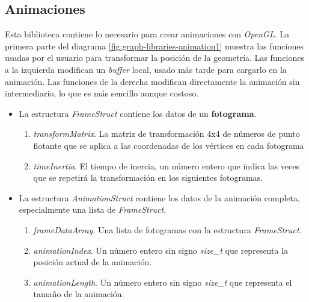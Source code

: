 \subsection{Animaciones}

Esta biblioteca contiene lo necesario para crear animaciones con \textit{OpenGL}. La primera parte del diagrama \ref{fig:graph-libraries-animation1}  muestra las funciones usadas por el usuario para transformar la posición de la geometría. Las funciones a la izquierda modifican un \textit{buffer} local, usado más tarde para cargarlo en la animación. Las funciones de la derecha modifican directamente la animación sin intermediario, lo que es más sencillo aunque costoso.

\begin{itemize}

    \item La estructura \textit{FrameStruct} contiene los datos de un \textbf{fotograma}.
        \begin{enumerate}
        
            \item \textit{transformMatrix}. La matriz de transformación 4x4 de números de punto flotante que se aplica a las coordenadas de los vértices en cada fotograma
            
            \item \textit{timeInertia}. El tiempo de inercia, un número entero que indica las veces que se repetirá la transformación en los siguientes fotogramas.
            
        \end{enumerate}
    
    \item La estructura \textit{AnimationStruct} contiene los datos de la animación completa, especialmente una lista de \textit{FrameStruct}.
        \begin{enumerate}
        
            \item \textit{frameDataArray}. Una lista de fotogramas con la estructura \textit{FrameStruct}.

            \item \textit{animationIndex}. Un número entero sin signo \textit{size\_t} que representa la posición actual de la animación.

            \item \textit{animationLength}. Un número entero sin signo \textit{size\_t} que representa el tamaño de la animación.


\end{enumerate}
\end{itemize}
